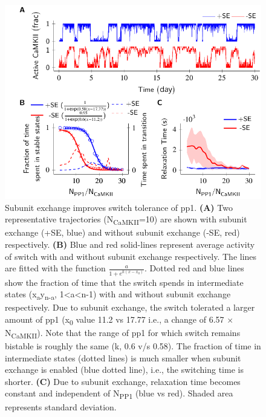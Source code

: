 \documentclass[9pt,lineno,doublespacing]{elife}
\newcommand\SUB[2]{#1\textsubscript{#2}}
\begin{document}
\begin{figure}[ht]
    \includegraphics[width=114mm]{PaperFigures/elifeFigure2/figure_effect_of_tolerace_114mm.pdf}
    \caption{Subunit exchange improves switch tolerance of \gls{pp1}.
        \textbf{(A)} Two representative trajectories (\SUB{N}{CaMKII}=10) are
        shown with subunit exchange (+SE, blue) and without
        subunit exchange (-SE, red) respectively. \textbf{(B)} Blue and red
        solid-lines represent average activity of switch with and without 
        subunit exchange respectively. The lines are fitted with the 
        function \(\frac{a}{1+e^{k(x-x_0)}}\).
        Dotted red and blue lines show the fraction of time that the switch
        spends in intermediate states (\SUB{x}{a}\SUB{y}{n-a}, 1<a<n-1) with
        and without subunit exchange respectively. Due to subunit exchange,
        the switch tolerated a larger amount of \gls{pp1} 
        (\SUB{x}{0} value 11.2 vs 17.77 i.e., a change of 6.57 $\times$ 
        \SUB{N}{CaMKII}). Note that the range 
        of \gls{pp1} for which switch remains bistable is roughly the 
        same (k, 0.6 v/s 0.58). The fraction of time in intermediate states (dotted lines)
	is much smaller when subunit exchange is enabled (blue dotted line),
        i.e., the switching time is shorter. \textbf{(C)} Due to subunit exchange, relaxation 
        time becomes constant and independent of \SUB{N}{PP1} (blue vs red). 
        Shaded area represents standard deviation.
    }\label{fig:tolerance_pp1}
\end{figure}
\end{document}
